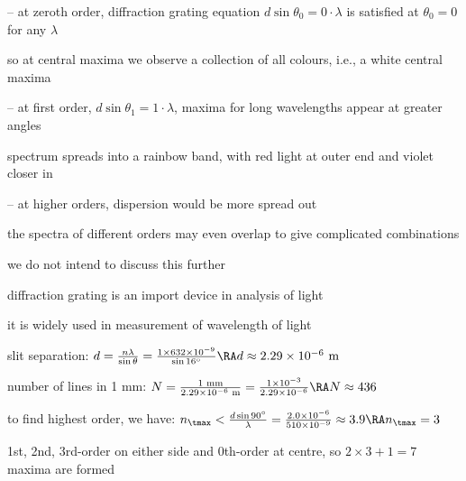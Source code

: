 \begin{compactitem}
	\item[--] at zeroth order, diffraction grating equation $d\sin\theta_0 = 0\cdot\lambda$ is satisfied at $\theta_0 = 0$ for any $\lambda$
	
	so at central maxima we observe a collection of all colours, i.e., a white central maxima
	
	\item[--] at first order, $d\sin\theta_1 = 1\cdot\lambda$, maxima for long wavelengths appear at greater angles
	
	spectrum spreads into a rainbow band, with red light at outer end and violet closer in
	
	\item[--] at higher orders, dispersion would be more spread out 
	
	the spectra of different orders may even overlap to give complicated combinations
	
	we do not intend to discuss this further
\end{compactitem}

\cmt diffraction grating is an import device in analysis of light

it is widely used in measurement of wavelength of light


\sol slit separation: $d = \frac{n\lambda}{\sin\theta} = \frac{1\times632\times10^{-9}}{\sin 16^\circ} \RA d \approx 2.29 \times 10^{-6} \text{ m}$

number of lines in 1 mm: $N = \frac{1 \text{ mm}}{2.29 \times 10^{-6} \text{ m}} = \frac{1 \times 10^{-3}}{2.29 \times 10^{-6}} \RA N \approx 436$ \eoe


\sol to find highest order, we have: $n_\tmax < \frac{d\sin 90^\circ}{\lambda} = \frac{2.0\times10^{-6}}{510\times10^{-9}} \approx 3.9 \RA n_\tmax = 3$

1st, 2nd, 3rd-order on either side and 0th-order at centre, so $ 2\times 3 + 1 = 7$ maxima are formed

